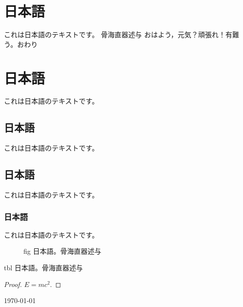 \documentclass[11pt]{article}
\begin{document}
\begin{japanese}
\section{日本語}
これは日本語のテキストです。
骨海直器述与 おはよう，元気？頑張れ！有難う。おわり
\section{日本語}
これは日本語のテキストです。
\subsection{日本語}
これは日本語のテキストです。
\subsection{日本語}
これは日本語のテキストです。
\subsubsection{日本語}
これは日本語のテキストです。

\begin{figure}
\caption{fig 日本語。骨海直器述与}
\end{figure}
\begin{table}
\caption{tbl 日本語。骨海直器述与}
\end{table}
\begin{proof}
$E = mc^2.$
\end{proof}

\today
\end{japanese}
\end{document}
